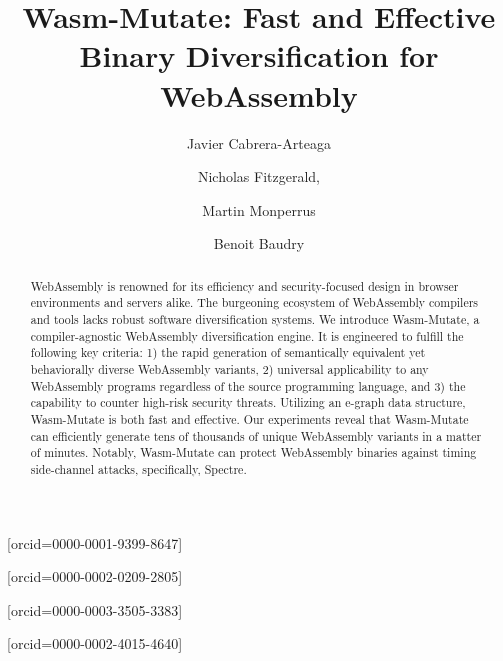 \documentclass[a4paper,fleqn]{cas-dc}
\newcommand{\tool}{{\sc Wasm-Mutate}\xspace}
\newcommand{\Wasm}{WebAssembly\xspace}
\newcommand{\wasm}{\Wasm}
\begin{document}
\sloppy



\newcommand\mytitle{\tool: Fast and Effective Binary Diversification for WebAssembly}
\shorttitle{}

\title [mode = title]{\mytitle}

\author[kth-address]{Javier Cabrera-Arteaga}[orcid=0000-0001-9399-8647]\cormark[1]
\author[fastly-address]{Nicholas Fitzgerald,}[orcid=0000-0002-0209-2805]
\author[kth-address]{Martin Monperrus}[orcid=0000-0003-3505-3383]
\author[kth-address]{Benoit Baudry}[orcid=0000-0002-4015-4640]

\address[kth-address]{KTH Royal Institute of Technology, Stockholm, Sweden}
\address[fastly-address]{Fastly Inc., San Francisco, USA }




\begin{abstract}
WebAssembly is renowned for its efficiency and security-focused design in browser environments and servers alike. 
The burgeoning ecosystem of WebAssembly compilers and tools lacks  robust software diversification systems.
We introduce \tool, a compiler-agnostic WebAssembly diversification engine. It is engineered to fulfill the following key criteria: 
1) the rapid generation of semantically equivalent yet behaviorally diverse WebAssembly variants, 
2) universal applicability to any  WebAssembly programs regardless of the source programming language, and 
3) the capability to counter high-risk security threats. 
Utilizing an e-graph data structure, \tool is both fast and effective.
Our experiments reveal that \tool can efficiently generate tens of thousands of unique WebAssembly variants in a matter of minutes.
Notably, \tool can protect \wasm binaries against timing side-channel attacks, specifically, Spectre. 
\end{abstract}
\end{document}

